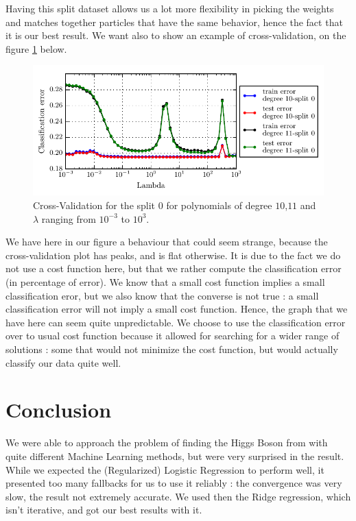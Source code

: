 \documentclass[10pt,conference,compsocconf]{IEEEtran}
\begin{document}
Having this split dataset allows us a lot more flexibility in picking the weights and matches together particles that have the same behavior, hence the fact that it is our best result. We want also to show an example of cross-validation, on the figure \ref{fig:cross-validation} below.

\begin{figure}[!ht]
	\centering
	\includegraphics[scale=.7]{Cross_validation_10_11}
	\caption{Cross-Validation for the split $0$ for polynomials of degree $10$,$11$ and $\lambda$ ranging from $10^{-3}$ to $10^3$.}
	\label{fig:cross-validation}
\end{figure}

We have here in our figure a behaviour that could seem strange, because the cross-validation plot has peaks, and is flat otherwise. It is due to the fact we do not use a cost function here, but that we rather compute the classification error (in percentage of error). We know that a small cost function implies a small classification eror, but we also know that the converse is not true : a small classification error will not imply a small cost function. Hence, the graph that we have here can seem quite unpredictable. We choose to use the classification error over to usual cost function because it allowed for searching for a wider range of solutions : some that would not minimize the cost function, but would actually classify our data quite well.
\section{Conclusion}
We were able to approach the problem of finding the Higgs Boson from with quite different Machine Learning methods, but were very surprised in the result. While we expected the (Regularized) Logistic Regression to perform well, it presented too many fallbacks for us to use it reliably : the convergence was very slow, the result not extremely accurate. We used then the Ridge regression, which isn't iterative, and got our best results with it.
\end{document}
